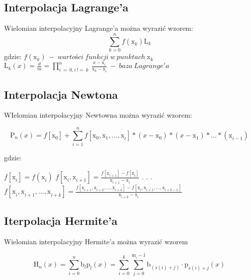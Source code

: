 \documentclass{article}
\begin{document}
\subsection{Interpolacja Lagrange'a}

Wielomian interpolacyjny Lagrange'a można wyrazić wzorem:
\[\sum_{k=0}^{n} f(\mathrm{x}_{k}^{})\mathrm{L}_{k}^{}\]
gdzie:
\bigbreak
\( f(\mathrm{x}_{k}^{})\ -\ wartości\ funkcji\ w\ punktach\ \mathrm{x}_{k}^{} \)
\bigbreak
\( \mathrm{L}_{k}^{}(x) = \frac{d}{m} = \prod_{i\ =\ 0, i\ !=\ k}^{n}\ \frac{x -\mathrm{x}_{i}^{}}{\mathrm{x}_{k}^{} - \mathrm{x}_{i}^{}}\ - \ baza\ Lagrange'a\)

\subsection{Interpolacja Newtona}

WIelomian interpolacyjny Newtowna można wyrazić wzorem:

\[ \mathrm{P}_{n}^{}(x) = f[\mathrm{x}_{0}^{}] + \sum_{i = 1}^{n}f[\mathrm{x}_{0}^{}, \mathrm{x}_{1}^{}, ..., \mathrm{x}_{i}^{}]*(x - \mathrm{x}_{0}^{})*(x - \mathrm{x}_{1}^{})*...*(\mathrm{x}_{i - 1}^{})\]

\noindent
gdzie:
\bigbreak

\( f[\mathrm{x}_{i}^{}] = f(\mathrm{x}_{i}^{}) \) \newline \indent
\( f[\mathrm{x}_{i}^{}, \mathrm{x}_{i+1}^{}] = \frac{f[\mathrm{x}_{i+1}^{}]-f[\mathrm{x}_{i}^{}]}{\mathrm{x}_{i+1}^{}-\mathrm{x}_{i}^{}} \) \newline \indent
\( . \) \newline \indent
\( . \) \newline \indent
\( . \) \newline \indent
\( f[\mathrm{x}_{i}^{}, \mathrm{x}_{i+1}^{}, ..., \mathrm{x}_{i + k}^{}] =
\frac{f[\mathrm{x}_{i+1}^{}, \mathrm{x}_{i+2}^{}, ..., \mathrm{x}_{i + k}^{}] - f[\mathrm{x}_{i}^{}, \mathrm{x}_{i+1}^{}, ..., \mathrm{x}_{i + k -1}^{}]}{\mathrm{x}_{i+k}^{} - \mathrm{x}_{i}^{}} \) \newline

\subsection{Iterpolacja Hermite'a}

Wielomian interpolacyjny Hermite'a można wyrazić wzorem

\[\mathrm{H}_{n}^{}(x) = \sum_{i = 0}^{n}\mathrm{b}_{l}^{}\mathrm{p}_{l}^{}(x) = 
\sum_{i = 0}^{k}\sum_{j=0}^{\mathrm{m}_{i}^{} - 1}\mathrm{b}_{(s(i) + j)}^{} \cdot 
\mathrm{p}_{s(i) + j}^{}(x) \]
\end{document}
